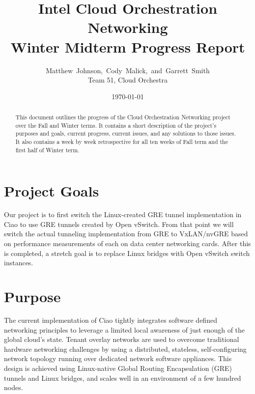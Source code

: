 \documentclass[10pt,onecolumn,journal,draftclsnofoot]{IEEEtran}
\begin{document}
\begin{titlepage}
	\title{Intel Cloud Orchestration Networking\\ Winter Midterm Progress Report}
	\author{Matthew~Johnson,~Cody~Malick,~and~Garrett~Smith\\
		Team 51, Cloud Orchestra}
	\date{\today}
	\maketitle
	\vspace{4cm}
	\begin{abstract}
		\noindent This document outlines the progress of the Cloud
		Orchestration Networking project over the Fall and Winter
		terms. It contains a short description of the project's purposes
		and goals, current progress, current issues, and any solutions
		to those issues. It also contains a week by week retrospective
		for all ten weeks of Fall term and the first half of Winter
		term. \end{abstract}

\end{titlepage}
\tableofcontents
\clearpage

\section{Project Goals}

Our project is to first switch the Linux-created GRE tunnel implementation in
Ciao to use GRE tunnels created by Open vSwitch. From that point we will switch
the actual tunneling implementation from GRE to VxLAN/nvGRE based on performance
measurements of each on data center networking cards. After this is completed, a
stretch goal is to replace Linux bridges with Open vSwitch switch instances.

\section{Purpose}

The current implementation of Ciao tightly integrates software defined
networking principles to leverage a limited local awareness of just enough of
the global cloud's state. Tenant overlay networks are used to overcome
traditional hardware networking challenges by using a distributed, stateless,
self-configuring network topology running over dedicated network software
appliances. This design is achieved using Linux-native Global Routing
Encapsulation (GRE) tunnels and Linux bridges, and scales well in an environment
of a few hundred nodes.
\end{document}
